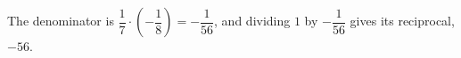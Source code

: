 The denominator is $\dfrac{1}{7}\cdot\left(-\dfrac{1}{8}\right)=-\dfrac{1}{56}$, and dividing $1$ by $-\dfrac{1}{56}$ gives its reciprocal, $\boxed{-56}$.
